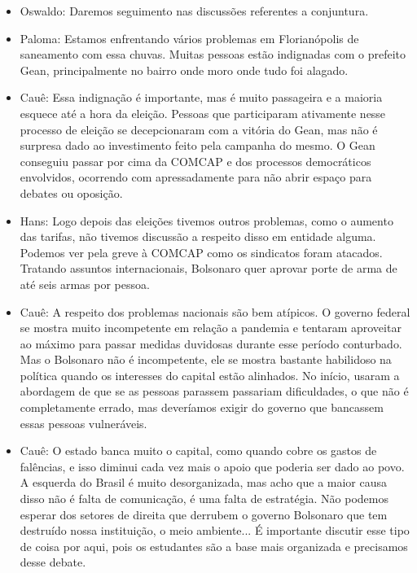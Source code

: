 \documentclass{ata-calico}
\begin{document}
\begin{itemize}
\item Oswaldo: Daremos seguimento nas discussões referentes a conjuntura.

\item Paloma: Estamos enfrentando vários problemas em Florianópolis de saneamento com essa chuvas. Muitas pessoas estão indignadas com o prefeito Gean, principalmente no bairro onde moro onde tudo foi alagado.

\item Cauê: Essa indignação é importante, mas é muito passageira e a maioria esquece até a hora da eleição. Pessoas que participaram ativamente nesse processo de eleição se decepcionaram com a vitória do Gean, mas não é surpresa dado ao investimento feito pela campanha do mesmo. O Gean conseguiu passar por cima da COMCAP e dos processos democráticos envolvidos, ocorrendo com apressadamente para não abrir espaço para debates ou oposição.

\item Hans: Logo depois das eleições tivemos outros problemas, como o aumento das tarifas, não tivemos discussão a respeito disso em entidade alguma. Podemos ver pela greve à COMCAP como os sindicatos foram atacados. Tratando assuntos internacionais, Bolsonaro quer aprovar porte de arma de até seis armas por pessoa.

\item Cauê: A respeito dos problemas nacionais são bem atípicos. O governo federal se mostra muito incompetente em relação a pandemia e tentaram aproveitar ao máximo para passar medidas duvidosas durante esse período conturbado. Mas o Bolsonaro não é incompetente, ele se mostra bastante habilidoso na política quando os interesses do capital estão alinhados. No início, usaram a abordagem de que se as pessoas parassem passariam dificuldades, o que não é completamente errado, mas deveríamos exigir do governo que bancassem essas pessoas vulneráveis.

\item Cauê: O estado banca muito o capital, como quando cobre os gastos de falências, e isso diminui cada vez mais o apoio que poderia ser dado ao povo. A esquerda do Brasil é muito desorganizada, mas acho que a maior causa disso não é falta de comunicação, é uma falta de estratégia. Não podemos esperar dos setores de direita que derrubem o governo Bolsonaro que tem destruído nossa instituição, o meio ambiente... É importante discutir esse tipo de coisa por aqui, pois os estudantes são a base mais organizada e precisamos desse debate.
\end{itemize}
\end{document}
